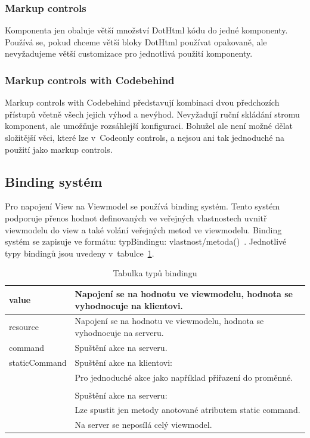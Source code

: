 \subsubsection{Markup controls}
 Komponenta jen obaluje větší množství DotHtml kódu do jedné komponenty. Používá se, pokud chceme větší bloky DotHtml používat opakovaně, ale nevyžadujeme větší customizace pro jednotlivá použití komponenty.
 
 \subsubsection{Markup controls with Codebehind}
 Markup controls with Codebehind představují kombinaci dvou předchozích přístupů včetně všech jejich výhod a nevýhod. Nevyžadují ruční skládání stromu komponent, ale umožňuje rozsáhlejší konfiguraci. Bohužel ale není možné dělat složitější věci, které lze v~Codeonly controls, a nejsou ani tak jednoduché na použití jako markup controls.
 
\subsection*{Binding systém}
\label{DotVVMBinding}
Pro napojení View na Viewmodel se používá binding systém. Tento systém podporuje přenos hodnot definovaných ve veřejných vlastnostech uvnitř viewmodelu do view a také volání veřejných metod ve viewmodelu.
Binding systém se zapisuje ve formátu: {typBindingu: vlastnost/metoda()}~\cite{DotVVM-Binding}. Jednotlivé typy bindingů jsou uvedeny v~tabulce~\ref{tab: Tabulka typů bindingu}.

\begin{table}[H]
	\caption{Tabulka typů bindingu} 
	\centering
	\begin{tabular}{m{8em}|m{30em}}
		\toprule
		value & Napojení se na hodnotu ve viewmodelu, hodnota se vyhodnocuje na klientovi.\\ \midrule
		resource & Napojení se na hodnotu ve viewmodelu, hodnota se vyhodnocuje na serveru.\\ \midrule
		command & Spuštění akce na serveru.\\ \midrule
		staticCommand & Spuštění akce na klientovi: \\
		& Pro jednoduché akce jako například přiřazení do proměnné. \\\\
		& Spuštění akce na serveru: \\
		& Lze spustit jen metody anotované atributem static command. \\
		& Na server se neposílá celý viewmodel. \\

		\bottomrule
	\end{tabular}
	\label{tab: Tabulka typů bindingu}
\end{table}

